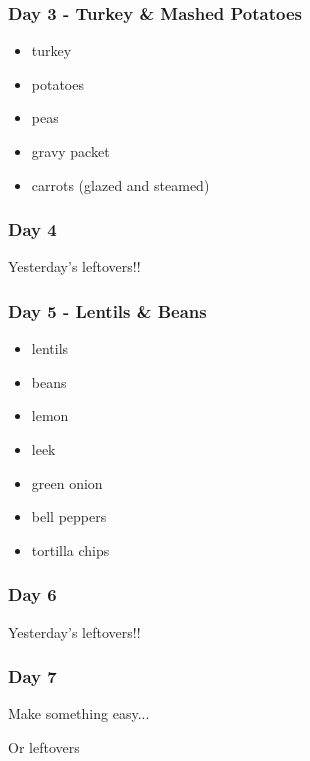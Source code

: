 \documentclass[11pt, a4paper]{article}
\begin{document}
\subsubsection{Day 3 - Turkey \& Mashed Potatoes}
\vspace{1pc}
\begin{itemize}
\item turkey
\item potatoes
\item peas
\item gravy packet
\item carrots (glazed and steamed)
\end{itemize}

\subsubsection{Day 4}
\vspace{1pc}
Yesterday's leftovers!!

\subsubsection{Day 5 - Lentils \& Beans}
\vspace{1pc}
\begin{itemize}
\item lentils
\item beans
\item lemon
\item leek
\item green onion
\item bell peppers
\item tortilla chips
\end{itemize}

\subsubsection{Day 6}
\vspace{1pc}
Yesterday's leftovers!!

\subsubsection{Day 7}
\vspace{1pc}
\noindent Make something easy...
\par
Or leftovers


\vspace{0.917 pc} %
\end{document}
